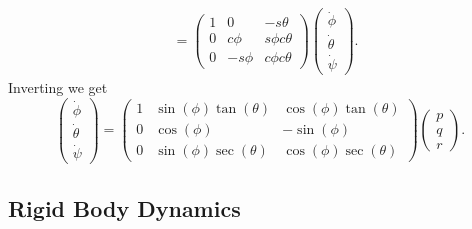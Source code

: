{\begin{align}
&= \begin{pmatrix}
  1 & 0 & -s\theta \\
  0 & c\phi & s\phi c\theta \\
  0 & -s\phi & c\phi c\theta
\end{pmatrix}
\begin{pmatrix} \dot{\phi} \\ \dot{\theta} \\ \dot{\psi} \end{pmatrix}.
\label{eq:kin-phithetapsidot-to-pqr}
\end{align}
Inverting we get
\begin{equation} \label{eq:kin-rotational-kinematics}
\begin{pmatrix} \dot{\phi} \\ \dot{\theta} \\ \dot{\psi} \end{pmatrix}
= \begin{pmatrix}
  1 & \sin(\phi)\tan(\theta) & \cos(\phi)\tan(\theta) \\
  0 & \cos(\phi) & -\sin(\phi) \\
  0 & \sin(\phi)\sec(\theta) & \cos(\phi)\sec(\theta)
  \end{pmatrix}
  \begin{pmatrix} p \\ q \\ r \end{pmatrix}.
\end{equation}

\subsection{Rigid Body Dynamics} %
\label{sec:kin-dynamics}

}

